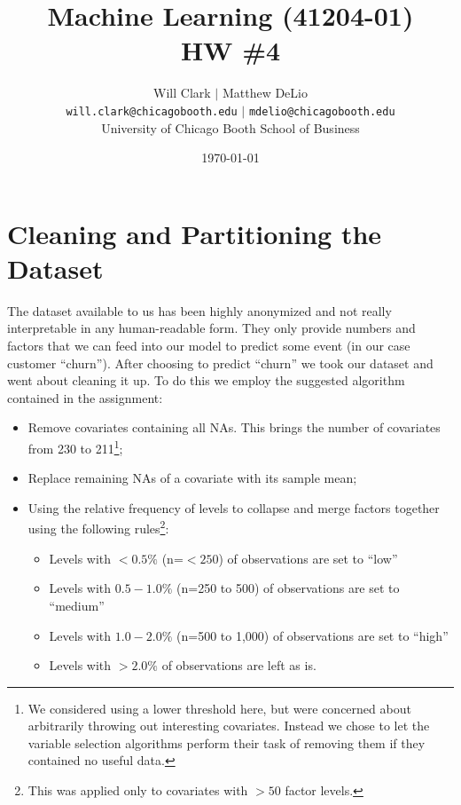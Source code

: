 \documentclass[11pt, fleqn]{article}
\begin{document}
\title{Machine Learning (41204-01)\\HW \#4}
\author{Will Clark $\vert$ Matthew DeLio \\
\texttt{will.clark@chicagobooth.edu} $\vert$ \texttt{mdelio@chicagobooth.edu} \\
University of Chicago Booth School of Business}
\date{\today}
\maketitle

\section{Cleaning and Partitioning the Dataset}
The dataset available to us has been highly anonymized and not really interpretable in any human-readable form.  They only provide numbers and factors that we can feed into our model to predict some event (in our case customer ``churn'').  After choosing to predict ``churn'' we took our dataset and went about cleaning it up.  To do this we employ the suggested algorithm contained in the assignment:
\begin{itemize}
\item Remove covariates containing all NAs.  This brings the number of covariates from 230 to 211\footnote{We considered using a lower threshold here, but were concerned about arbitrarily throwing out interesting covariates.  Instead we chose to let the variable selection algorithms perform their task of removing them if they contained no useful data.};
\item Replace remaining NAs of a covariate with its sample mean;
\item Using the relative frequency of levels to collapse and merge factors together using the following rules\footnote{This was applied only to covariates with $>50$ factor levels.}:
\begin{itemize}
\item Levels with $<0.5\%$ (n=$<250$) of observations are set to ``low''
\item Levels with $0.5-1.0\%$ (n=250 to 500) of observations are set to ``medium''
\item Levels with $1.0-2.0\%$ (n=500 to 1,000) of observations are set to ``high''
\item Levels with $>2.0\%$ of observations are left as is.
\end{itemize}
\end{itemize}
\end{document}
